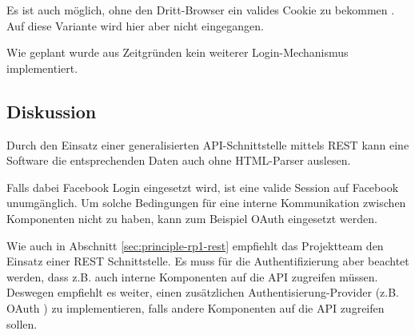 Es ist auch möglich, ohne den Dritt-Browser ein valides Cookie zu bekommen \cite{facebookLoginGist}. Auf diese Variante wird hier aber nicht eingegangen.

Wie geplant wurde aus Zeitgründen kein weiterer Login-Mechanismus implementiert.

\subsection*{Diskussion}
Durch den Einsatz einer generalisierten API-Schnittstelle mittels \gls{REST} kann eine Software die entsprechenden Daten auch ohne HTML-Parser auslesen.

Falls dabei Facebook Login eingesetzt wird, ist eine valide Session auf Facebook unumgänglich. Um solche Bedingungen für eine interne Kommunikation zwischen Komponenten nicht zu haben, kann zum Beispiel OAuth \cite{oauth} eingesetzt werden.

Wie auch in Abschnitt \ref{sec:principle-rp1-rest} empfiehlt das Projektteam den Einsatz einer REST Schnittstelle. Es muss für die Authentifizierung aber beachtet werden, dass z.B. auch interne Komponenten auf die API zugreifen müssen. Deswegen empfiehlt es weiter, einen zusätzlichen Authentisierung-Provider (z.B. OAuth \cite{oauth}) zu implementieren, falls andere Komponenten auf die API zugreifen sollen.